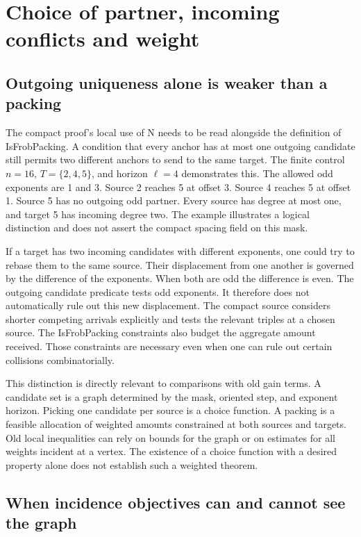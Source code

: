 \documentclass[12pt,letterpaper]{article}
\DeclareRobustCommand{\id}[1]{\mbox{\small\ttfamily #1}}
\begin{document}
\section{Choice of partner, incoming conflicts and weight}
\label{sec:incoming}

\subsection{Outgoing uniqueness alone is weaker than a packing}

The compact proof's local use of \id{N} needs to be read alongside the definition of \id{IsFrobPacking}. A condition that every anchor has at most one outgoing candidate still permits two different anchors to send to the same target. The finite control \(n=16\), \(T=\{2,4,5\}\), and horizon \(\ell=4\) demonstrates this. The allowed odd exponents are 1 and 3. Source 2 reaches 5 at offset 3. Source 4 reaches 5 at offset 1. Source 5 has no outgoing odd partner. Every source has degree at most one, and target 5 has incoming degree two. The example illustrates a logical distinction and does not assert the compact spacing field on this mask.

If a target has two incoming candidates with different exponents, one could try to rebase them to the same source. Their displacement from one another is governed by the difference of the exponents. When both are odd the difference is even. The outgoing candidate predicate tests odd exponents. It therefore does not automatically rule out this new displacement. The compact source considers shorter competing arrivals explicitly and tests the relevant triples at a chosen source. The \id{IsFrobPacking} constraints also budget the aggregate amount received. Those constraints are necessary even when one can rule out certain collisions combinatorially.

This distinction is directly relevant to comparisons with old gain terms. A candidate set is a graph determined by the mask, oriented step, and exponent horizon. Picking one candidate per source is a choice function. A packing is a feasible allocation of weighted amounts constrained at both sources and targets. Old local inequalities can rely on bounds for the graph or on estimates for all weights incident at a vertex. The existence of a choice function with a desired property alone does not establish such a weighted theorem.

\subsection{When incidence objectives can and cannot see the graph}
\end{document}
